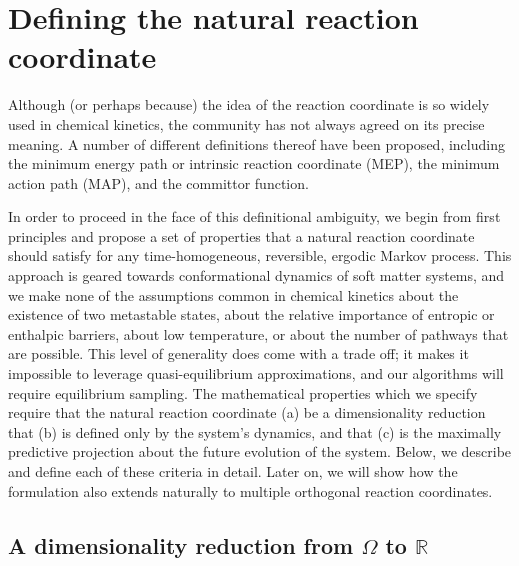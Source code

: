 \documentclass[aip, jcp, preprint, linenumbers, nofootinbib]{revtex4-1}
\begin{document}
\section{Defining the natural reaction coordinate}

Although (or perhaps because) the idea of the reaction coordinate is so widely used in chemical kinetics, the community has not always agreed on its precise meaning. A number of different definitions thereof have been proposed, including the minimum energy path or intrinsic reaction coordinate (MEP),\cite{fukui1970formulation, tachibana1980novel, quapp1984analysis, yamashita1981irc} the minimum action path (MAP),\cite{olender1997yet, heymann2008geometric, eastman2001simulation, ren2004minimum, lipfert2005protein} and the committor function.\cite{Bolhuis2002TRANSITION, dellago2002transition}

In order to proceed in the face of this definitional ambiguity, we begin from first principles and propose a set of properties that a natural reaction coordinate should satisfy for any time-homogeneous, reversible, ergodic Markov process. This approach is geared towards conformational dynamics of soft matter systems, and we make none of the assumptions common in chemical kinetics about the existence of two metastable states, about the relative importance of entropic or enthalpic barriers, about low temperature, or about the number of pathways that are possible. This level of generality does come with a trade off; it makes it impossible to leverage quasi-equilibrium approximations, and our algorithms will require equilibrium sampling. The mathematical properties which we specify require that the natural reaction coordinate (a) be a dimensionality reduction that (b) is defined only by the system's dynamics, and that (c) is the maximally predictive projection about the future evolution of the system. Below, we describe and define each of these criteria in detail.
Later on, we will show how the formulation also extends naturally to multiple orthogonal reaction coordinates.

\subsection{A dimensionality reduction from $\Omega$ to $\mathbb{R}$}
\end{document}
